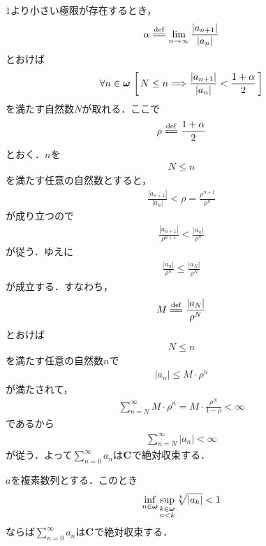 	\begin{sketch}
		$1$より小さい極限が存在するとき，
		\begin{align}
			\alpha \defeq \lim_{n \to \infty} \frac{|a_{n+1}|}{|a_n|}
		\end{align}
		とおけば
		\begin{align}
			\forall n \in {\boldsymbol \omega}\, 
			\left[\, N \leq n \Longrightarrow \frac{|a_{n+1}|}{|a_n|} < \frac{1+\alpha}{2}\, \right]
		\end{align}
		を満たす自然数$N$が取れる．ここで
		\begin{align}
			\rho \defeq \frac{1+\alpha}{2}
		\end{align}
		とおく．$n$を
		\begin{align}
			N \leq n
		\end{align}
		を満たす任意の自然数とすると，
		\begin{align}
			\frac{|a_{n+1}|}{|a_n|} < \rho = \frac{\rho^{n+1}}{\rho^n}
		\end{align}
		が成り立つので
		\begin{align}
			\frac{|a_{n+1}|}{\rho^{n+1}} < \frac{|a_n|}{\rho^n}
		\end{align}
		が従う．ゆえに
		\begin{align}
			\frac{|a_n|}{\rho^n} \leq \frac{|a_N|}{\rho^N}
		\end{align}
		が成立する．すなわち，
		\begin{align}
			M \defeq \frac{|a_N|}{\rho^N}
		\end{align}
		とおけば
		\begin{align}
			N \leq n
		\end{align}
		を満たす任意の自然数$n$で
		\begin{align}
			|a_n| \leq M \cdot \rho^n
		\end{align}
		が満たされて，
		\begin{align}
			\sum_{n=N}^\infty M \cdot \rho^n = M \cdot \frac{\rho^N}{1-\rho} < \infty
		\end{align}
		であるから
		\begin{align}
			\sum_{n=N}^\infty |a_n| < \infty
		\end{align}
		が従う．よって$\sum_{n=0}^\infty a_n$は$\mathbf{C}$で絶対収束する．
		\QED
	\end{sketch}
	
	\begin{screen}
		\begin{thm}[Cauchyの冪根判定法]
			$a$を複素数列とする．このとき
			\begin{align}
				\operatorname*{inf}_{n \in {\boldsymbol \omega}} \operatorname*{sup}_{\substack{k \in {\boldsymbol \omega} \\ n < k}} \sqrt[k]{|a_k|} < 1
				\label{fom:Cauchy_root_test_1}
			\end{align}
			ならば$\sum_{n=0}^\infty a_n$は$\mathbf{C}$で絶対収束する．
		\end{thm}
	\end{screen}
	
